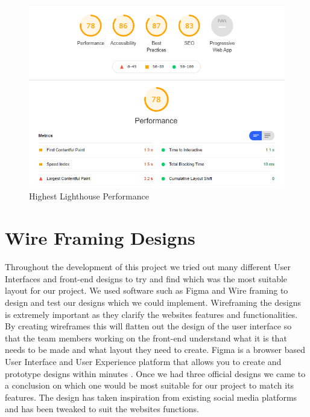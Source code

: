 \begin{figure}[H]
  \centering
  \includegraphics[scale=0.6]{img/best_lighthouse.jpg}
  \caption{Highest Lighthouse Performance}
  \label{fig:highest_lighthouse}
\end{figure}

\newline

\section{Wire Framing Designs}

Throughout the development of this project we tried out many different User Interfaces and front-end designs to try and find which was the most suitable layout for our project. We used software such as Figma and Wire framing to design and test our designs which we could implement. Wireframing the designs is extremely important as they clarify the websites features and functionalities. By creating wireframes this will flatten out the design of the user interface so that the team members working on the front-end understand what it is that needs to be made and what layout they need to create. Figma is a browser based User Interface and User Experience platform that allows you to create and prototype designs within minutes \cite{figma}. Once we had three official designs we came to a conclusion on which one would be most suitable for our project to match its features. The design has taken inspiration from existing social media platforms and has been tweaked to suit the websites functions. 

